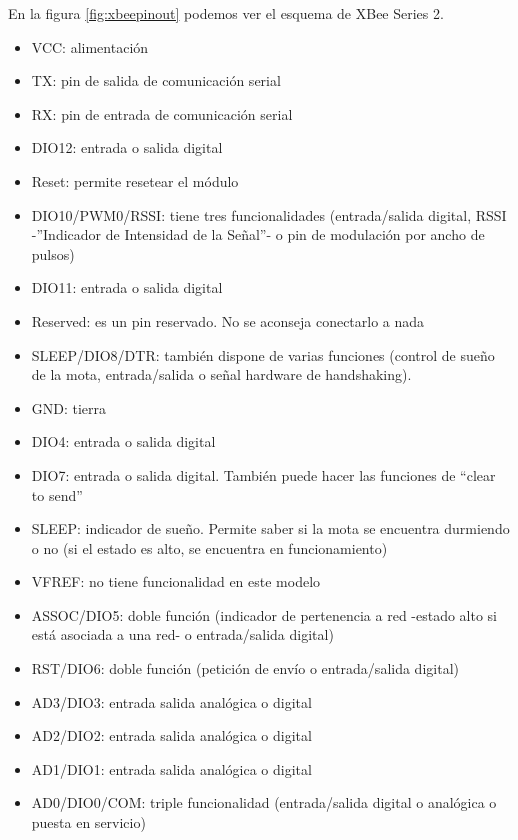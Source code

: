 En la figura \ref{fig:xbeepinout} podemos ver el esquema de XBee Series 2.

\begin{itemize}
  \item VCC: alimentación
  \item TX: pin de salida de comunicación serial
  \item RX: pin de entrada de comunicación serial
  \item DIO12: entrada o salida digital
  \item Reset: permite resetear el módulo
  \item DIO10/PWM0/RSSI: tiene tres funcionalidades (entrada/salida digital,
    RSSI -”Indicador de Intensidad de la Señal”- o pin de modulación por ancho de pulsos)
  \item DIO11: entrada o salida digital
  \item Reserved: es un pin reservado. No se aconseja conectarlo a nada
  \item SLEEP/DIO8/DTR: también dispone de varias funciones (control de sueño de la mota,
    entrada/salida o señal hardware de handshaking).
  \item GND: tierra
  \item DIO4: entrada o salida digital
  \item DIO7: entrada o salida digital. También puede hacer las funciones de “clear to send”
  \item SLEEP: indicador de sueño. Permite saber si la mota se encuentra durmiendo
    o no (si el estado es alto, se encuentra en funcionamiento)
  \item VFREF: no tiene funcionalidad en este modelo
  \item ASSOC/DIO5: doble función (indicador de pertenencia a red -estado alto si
    está asociada a una red- o entrada/salida digital)
  \item RST/DIO6: doble función (petición de envío o entrada/salida digital)
  \item AD3/DIO3: entrada salida analógica o digital
  \item AD2/DIO2: entrada salida analógica o digital
  \item AD1/DIO1: entrada salida analógica o digital
  \item AD0/DIO0/COM: triple funcionalidad (entrada/salida digital o analógica o puesta en servicio)
\end{itemize}

